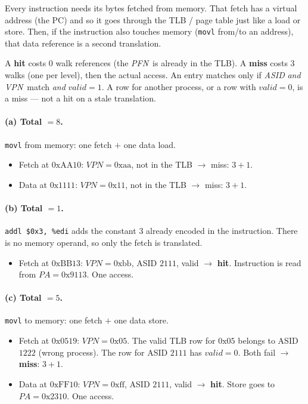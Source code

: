 \documentclass[11pt,a4paper]{article}
\newcommand{\pa}{\textit{PA}}
\newcommand{\vpn}{\textit{VPN}}
\newcommand{\pfn}{\textit{PFN}}
\begin{document}
\begin{solbox}
Every instruction needs its bytes fetched from memory. That fetch
has a virtual address (the PC) and so it goes through the TLB / page
table just like a load or store. Then, if the instruction also
touches memory (\texttt{movl} from/to an address), that data
reference is a second translation.

A \textbf{hit} costs 0 walk references (the \pfn\ is already in the
TLB). A \textbf{miss} costs 3 walks (one per level), then the
actual access. An entry matches only if \textit{ASID} \emph{and}
\vpn\ match \emph{and} \(\textit{valid}=1\). A row for another
process, or a row with \(\textit{valid}=0\), is a miss --- not a
hit on a stale translation.

\paragraph{(a) Total \(=8\).}
\texttt{movl} from memory: one fetch \(+\) one data load.
\begin{itemize}
  \item Fetch at \(0\text{xAA10}\): \(\vpn=0\text{xaa}\), not in the TLB
        \(\to\) miss: \(3+1\).
  \item Data at \(0\text{x1111}\): \(\vpn=0\text{x11}\), not in the TLB
        \(\to\) miss: \(3+1\).
\end{itemize}

\paragraph{(b) Total \(=1\).}
\texttt{addl \$0x3, \%edi} adds the constant \(3\) already encoded
in the instruction. There is no memory operand, so only the fetch
is translated.
\begin{itemize}
  \item Fetch at \(0\text{xBB13}\): \(\vpn=0\text{xbb}\), ASID \(2111\),
        valid \(\to\) \textbf{hit}. Instruction is read from
        \(\pa=0\text{x9113}\). One access.
\end{itemize}

\paragraph{(c) Total \(=5\).}
\texttt{movl} to memory: one fetch \(+\) one data store.
\begin{itemize}
  \item Fetch at \(0\text{x0519}\): \(\vpn=0\text{x05}\).
        The valid TLB row for \(0\text{x05}\) belongs to ASID \(1222\)
        (wrong process). The row for ASID \(2111\) has \(\textit{valid}=0\).
        Both fail \(\to\) \textbf{miss}: \(3+1\).
  \item Data at \(0\text{xFF10}\): \(\vpn=0\text{xff}\), ASID \(2111\),
        valid \(\to\) \textbf{hit}. Store goes to \(\pa=0\text{x2310}\).
        One access.
\end{itemize}
\end{solbox}
\end{document}
